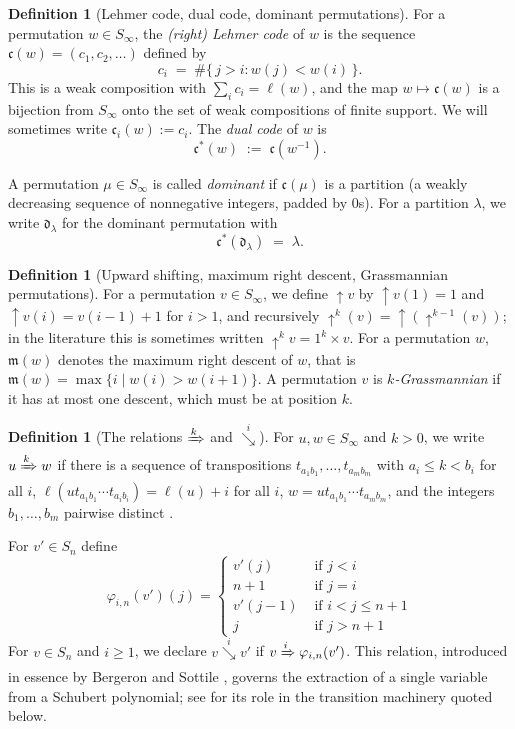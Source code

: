 \documentclass{amsart}
\theoremstyle{definition}
\newtheorem{definition}[lemma]{Definition}
\theoremstyle{remark}
\numberwithin{equation}{subsection}
\newcommand{\shup}{{\uparrow}}
\newcommand{\downvar}[1]{\stackrel{#1}{\searrow}}
\newcommand{\Tom}[1]{\xRightarrow{#1}}
\newcommand{\dom}{\mathfrak{d}}
\newcommand{\code}{\mathfrak{c}}
\newcommand{\maxd}{\mathfrak{m}}
\begin{document}
\begin{definition}[Lehmer code, dual code, dominant permutations]\label{definition:codestuff}
For a permutation $w\in S_\infty$, the \emph{(right) Lehmer code} of $w$ is the sequence $\code(w)=(c_1,c_2,\ldots)$ defined by
$$c_i \;=\; \#\{\,j>i : w(j)<w(i)\,\}.$$
This is a weak composition with $\sum_i c_i=\ell(w)$, and the map $w\mapsto\code(w)$ is a bijection from $S_\infty$ onto the set of weak compositions of finite support. We will sometimes write $\code_i(w):=c_i$. The \emph{dual code} of $w$ is
$$\code^*(w) \;:=\; \code(w^{-1}).$$

A permutation $\mu\in S_\infty$ is called \emph{dominant} if $\code(\mu)$ is a partition (a weakly decreasing sequence of nonnegative integers, padded by $0$s). For a partition $\lambda$, we write $\dom_\lambda$ for the dominant permutation with
$$\code^*(\dom_\lambda) \;=\; \lambda.$$
\end{definition}

\begin{definition}[Upward shifting, maximum right descent, Grassmannian permutations]
For a permutation $v\in S_\infty$, we define $\shup{v}$ by $\shup{v}(1)=1$ and $\shup{v}(i)=v(i-1)+1$ for $i>1$, and recursively $\shup^k(v)=\shup(\shup^{k-1}(v))$; in the literature this is sometimes written $\shup^kv = 1^k\times v$. For a permutation $w$, $\maxd(w)$ denotes the maximum right descent of $w$, that is $\maxd(w) = \max\{i\mid w(i)>w(i+1)\}$. A permutation $v$ is \emph{$k$-Grassmannian} if it has at most one descent, which must be at position $k$.
\end{definition}

\begin{definition}[The relations $\Tom{k}$ and $\downvar{i}$]
For $u,w\in S_\infty$ and $k>0$, we write $u\Tom{k} w$ if there is a sequence of transpositions $t_{a_1b_1},\ldots,t_{a_mb_m}$ with $a_i\leq k<b_i$ for all $i$, $\ell(ut_{a_1b_1}\cdots t_{a_ib_i})=\ell(u)+i$ for all $i$, $w=ut_{a_1b_1}\cdots t_{a_mb_m}$, and the integers $b_1,\ldots,b_m$ pairwise distinct \cite{sottile}.

For $v'\in S_n$ define
$$\varphi_{i,n}(v')(j)=\begin{cases}
	v'(j)&\mbox{ if }j<i\\
	n+1&\mbox{ if }j=i\\
	v'(j-1)&\mbox{ if }i<j\leq n+1\\
	j&\mbox{ if }j>n+1
\end{cases}$$
For $v\in S_n$ and $i\geq 1$, we declare $v\downvar{i} v'$ if $v\Tom{i}\varphi_{i,n}(v')$. This relation, introduced in essence by Bergeron and Sottile \cite{bsskew}, governs the extraction of a single variable from a Schubert polynomial; see \cite{companionbialgebra} for its role in the transition machinery quoted below.
\end{definition}
\end{document}
